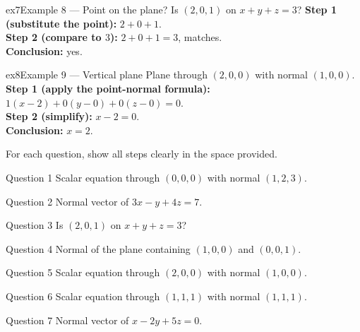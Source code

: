 \documentclass[11pt]{article}
\begin{document}
\begin{example}{ex7}{Example 8 --- Point on the plane?}
Is $(2,0,1)$ on $x+y+z=3$?\soln
\textbf{Step 1 (substitute the point):} $2+0+1$.\\[3pt]
\textbf{Step 2 (compare to $3$):} $2+0+1=3$, matches.\\[3pt]
\textbf{Conclusion:} yes.
\end{example}

\begin{example}{ex8}{Example 9 --- Vertical plane}
Plane through $(2,0,0)$ with normal $(1,0,0)$.\soln
\textbf{Step 1 (apply the point-normal formula):} $1(x-2)+0(y-0)+0(z-0)=0$.\\[3pt]
\textbf{Step 2 (simplify):} $x-2=0$.\\[3pt]
\textbf{Conclusion:} $x=2$.
\end{example}

\clearpage
{}
For each question, show all steps clearly in the space provided.

\begin{qbox}{Question 1}
Scalar equation through $(0,0,0)$ with normal $(1,2,3)$.\workspace{2.4cm}
\end{qbox}

\begin{qbox}{Question 2}
Normal vector of $3x-y+4z=7$.\workspace{2.4cm}
\end{qbox}

\begin{qbox}{Question 3}
Is $(2,0,1)$ on $x+y+z=3$?\workspace{2.4cm}
\end{qbox}

\begin{qbox}{Question 4}
Normal of the plane containing $(1,0,0)$ and $(0,0,1)$.\workspace{2.4cm}
\end{qbox}

\begin{qbox}{Question 5}
Scalar equation through $(2,0,0)$ with normal $(1,0,0)$.\workspace{2.4cm}
\end{qbox}

\begin{qbox}{Question 6}
Scalar equation through $(1,1,1)$ with normal $(1,1,1)$.\workspace{2.4cm}
\end{qbox}

\begin{qbox}{Question 7}
Normal vector of $x-2y+5z=0$.\workspace{2.4cm}
\end{qbox}
\end{document}
